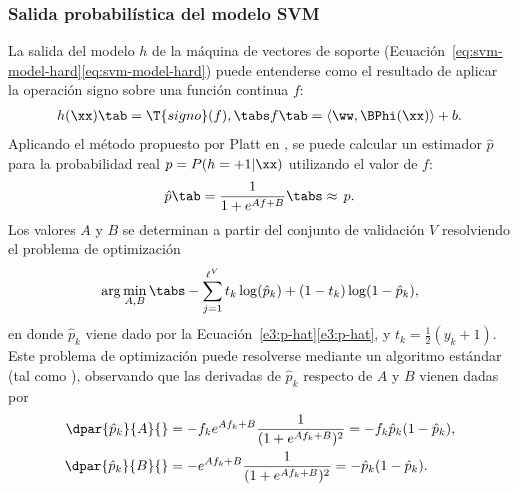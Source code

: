 %
\subsubsection{Salida probabilística del modelo SVM}
%
La salida del modelo $h$ de la máquina de vectores de soporte
(\iflatexml{}Ecuación~\ref{eq:svm-model-hard}\else\autoref{eq:svm-model-hard}\fi)
puede entenderse como el resultado de aplicar la operación signo sobre
una función continua $f$:
%
\begin{align}
\label{e3:svm-model-as-sign-f}
  h(\xx) \tab= \T{signo}(f),\tabs
  f\tab=\langle\ww,\BPhi(\xx)\rangle+b.
\end{align}
%
Aplicando el método propuesto por {Platt} en \cite{platt}, se puede
calcular un estimador $\hat{p}$ para la probabilidad real
$p=P(h=+1|\xx)$ utilizando el valor de $f$:
%
\begin{align}
\label{e3:p-hat}
  \hat{p}\tab=\frac{1}{1+e^{Af+B}} \tabs\approx\,{}p.%
\end{align}
%
Los valores $A$ y $B$ se determinan a partir del conjunto de validación
$V$ resolviendo el problema de optimización
%
\begin{align}
  \arg\min_{A,B} \tabs -\sum_{j=1}^{\ell^V} t_k\log(\hat{p}_k)+(1-t_k)\log(1-\hat{p}_k),
  \label{abproblem}
\end{align}
%
en donde $\hat{p}_k$ viene dado por la
\iflatexml{}Ecuación~\ref{e3:p-hat}\else\autoref{e3:p-hat}\fi{}, y
$t_k=\frac{1}{2}({y_k+1})$.
Este problema de optimización puede resolverse mediante un algoritmo
estándar (tal como \cite{bfgs}), observando que las derivadas de
$\hat{p}_k$ respecto de $A$ y $B$ vienen dadas por
%
\begin{align}
  \begin{split}
    \dpar{\hat{p}_k}{A}{}&=-f_k e^{Af_k+B}\frac{1}{(1+e^{Af_k+B})^2}
    =-f_k\hat{p}_k(1-\hat{p}_k),\\
    \dpar{\hat{p}_k}{B}{}&=    -e^{Af_k+B}\frac{1}{(1+e^{Af_k+B})^2}
    =-   \hat{p}_k(1-\hat{p}_k).
  \end{split}
\label{e3:deriv-pk-wrt-AB}
\end{align}
%


